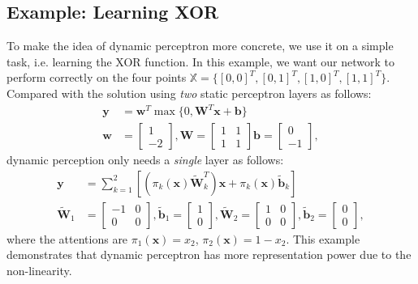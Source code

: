 \documentclass[10pt,twocolumn,letterpaper]{article}
\begin{document}
\subsection{Example: Learning XOR} 
To make the idea of dynamic perceptron more concrete, we use it on a simple task, i.e. learning the XOR function. In this example, we want our network to perform correctly on the four points $\mathbb{X}=\{[0,0]^T, [0,1]^T, [1,0]^T, [1,1]^T\}$. Compared with the solution using \textit{two} static perceptron layers \cite{Goodfellow:2016:DL:3086952} as follows:
\begin{align}
\bm{y} &= \bm{w}^T\max\{0, \bm{W}^T\bm{x}+\bm{b}\} \nonumber \\
\bm{w}&=\begin{bmatrix}
    1 \\ -2
\end{bmatrix},
\bm{W}=\begin{bmatrix}
    1 & 1 \\ 1 & 1
\end{bmatrix}
\bm{b}=\begin{bmatrix}
    0 \\ -1
\end{bmatrix},
\label{eq:static-xor}
\end{align}
%
dynamic perception only needs a \textit{single} layer as follows:
\begin{align}
\bm{y} &= \sum_{k=1}^2\left[\left(\pi_k(\bm{x})\bm{\tilde{W}}_k^T\right)\bm{x}+\pi_k(\bm{x})\bm{\tilde{b}}_k\right] \nonumber \\
\bm{\tilde{W}}_1&=\begin{bmatrix}
    -1 & 0 \\ 0 & 0
\end{bmatrix},
\bm{\tilde{b}}_1=\begin{bmatrix}
    1 \\ 0
\end{bmatrix},
\bm{\tilde{W}}_2=\begin{bmatrix}
    1 & 0 \\ 0 & 0
\end{bmatrix},
\bm{\tilde{b}}_2=\begin{bmatrix}
    0 \\ 0
\end{bmatrix},
\label{eq:dynamic-xor}
\end{align}
where the attentions are $\pi_1(\bm{x})=x_2$, $\pi_2(\bm{x})=1-x_2$. This example demonstrates that dynamic perceptron has more representation power due to the non-linearity.  
\end{document}
